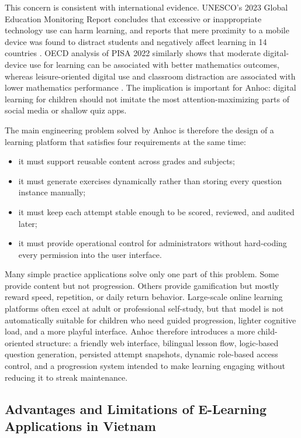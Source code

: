 This concern is consistent with international evidence. UNESCO's 2023 Global Education Monitoring Report concludes that excessive or inappropriate technology use can harm learning, and reports that mere proximity to a mobile device was found to distract students and negatively affect learning in 14 countries \cite{unesco-gem-2023}. OECD analysis of PISA 2022 similarly shows that moderate digital-device use for learning can be associated with better mathematics outcomes, whereas leisure-oriented digital use and classroom distraction are associated with lower mathematics performance \cite{oecd-screen-time-2024}. The implication is important for Anhoc: digital learning for children should not imitate the most attention-maximizing parts of social media or shallow quiz apps.

The main engineering problem solved by Anhoc is therefore the design of a learning platform that satisfies four requirements at the same time:
\begin{itemize}
  \item it must support reusable content across grades and subjects;
  \item it must generate exercises dynamically rather than storing every question instance manually;
  \item it must keep each attempt stable enough to be scored, reviewed, and audited later;
  \item it must provide operational control for administrators without hard-coding every permission into the user interface.
\end{itemize}

Many simple practice applications solve only one part of this problem. Some provide content but not progression. Others provide gamification but mostly reward speed, repetition, or daily return behavior. Large-scale online learning platforms often excel at adult or professional self-study, but that model is not automatically suitable for children who need guided progression, lighter cognitive load, and a more playful interface. Anhoc therefore introduces a more child-oriented structure: a friendly web interface, bilingual lesson flow, logic-based question generation, persisted attempt snapshots, dynamic role-based access control, and a progression system intended to make learning engaging without reducing it to streak maintenance.

\subsection{Advantages and Limitations of E-Learning Applications in Vietnam}

